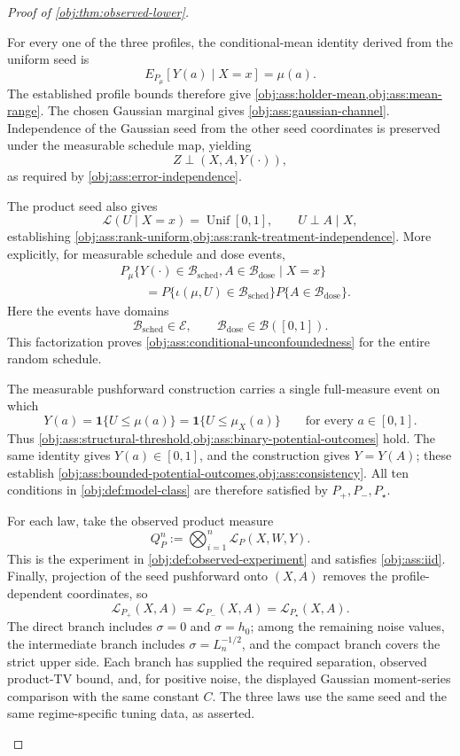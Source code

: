 \begin{proof}[Proof of \cref{obj:thm:observed-lower}]
\begin{enumerate}
For every one of the three profiles, the conditional-mean identity derived from the uniform seed is
\[
E_{P_\mu}[Y(a)\mid X=x]=\mu(a).
\]
The established profile bounds therefore give
\cref{obj:ass:holder-mean,obj:ass:mean-range}. The chosen Gaussian marginal gives \cref{obj:ass:gaussian-channel}. Independence of the Gaussian seed from the other seed coordinates is preserved under the measurable schedule map, yielding
\[
Z\perp(X,A,Y(\cdot)),
\]
as required by \cref{obj:ass:error-independence}.

The product seed also gives
\[
\mathcal L(U\mid X=x)=\operatorname{Unif}[0,1],
\qquad U\perp A\mid X,
\]
establishing \cref{obj:ass:rank-uniform,obj:ass:rank-treatment-independence}. More explicitly, for measurable schedule and dose events,
\[
\begin{aligned}
&P_\mu\{Y(\cdot)\in\mathcal B_{\mathrm{sched}},
A\in\mathcal B_{\mathrm{dose}}\mid X=x\}\\
&\qquad=
P\{\iota(\mu,U)\in\mathcal B_{\mathrm{sched}}\}
P\{A\in\mathcal B_{\mathrm{dose}}\}.
\end{aligned}
\]
Here the events have domains
\[
\mathcal B_{\mathrm{sched}}\in\mathcal E,\qquad
\mathcal B_{\mathrm{dose}}\in\mathcal B([0,1]).
\]
This factorization proves \cref{obj:ass:conditional-unconfoundedness} for the entire random schedule.

The measurable pushforward construction carries a single full-measure event on which
\[
Y(a)=\mathbf1\{U\le\mu(a)\}
=\mathbf1\{U\le\mu_X(a)\}
\qquad\text{for every }a\in[0,1].
\]
Thus \cref{obj:ass:structural-threshold,obj:ass:binary-potential-outcomes} hold. The same identity gives \(Y(a)\in[0,1]\), and the construction gives \(Y=Y(A)\); these establish \cref{obj:ass:bounded-potential-outcomes,obj:ass:consistency}. All ten conditions in \cref{obj:def:model-class} are therefore satisfied by \(P_+,P_-,P_\star\).

For each law, take the observed product measure
\[
Q_P^n:=\bigotimes_{i=1}^n\mathcal L_P(X,W,Y).
\]
This is the experiment in \cref{obj:def:observed-experiment} and satisfies \cref{obj:ass:iid}. Finally, projection of the seed pushforward onto \((X,A)\) removes the profile-dependent coordinates, so
\[
\mathcal L_{P_+}(X,A)
=\mathcal L_{P_-}(X,A)
=\mathcal L_{P_\star}(X,A).
\]
The direct branch includes \(\sigma=0\) and \(\sigma=h_0\); among the remaining noise values, the intermediate branch includes \(\sigma=L_n^{-1/2}\), and the compact branch covers the strict upper side. Each branch has supplied the required separation, observed product-TV bound, and, for positive noise, the displayed Gaussian moment-series comparison with the same constant \(C\). The three laws use the same seed and the same regime-specific tuning data, as asserted.
\end{enumerate}
\end{proof}
